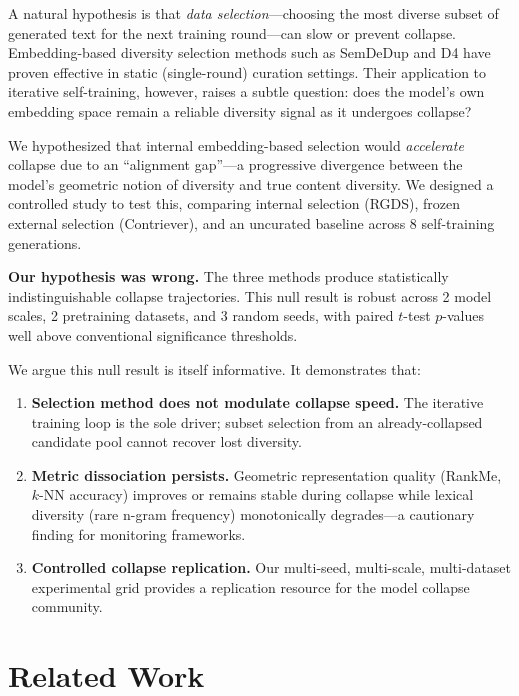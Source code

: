 \documentclass[11pt]{article}
\begin{document}
A natural hypothesis is that \emph{data selection}---choosing the most diverse subset of generated text for the next training round---can slow or prevent collapse. Embedding-based diversity selection methods such as SemDeDup \citep{abbas2023semdedup} and D4 \citep{tirumala2023d4} have proven effective in static (single-round) curation settings. Their application to iterative self-training, however, raises a subtle question: does the model's own embedding space remain a reliable diversity signal as it undergoes collapse?

We hypothesized that internal embedding-based selection would \emph{accelerate} collapse due to an ``alignment gap''---a progressive divergence between the model's geometric notion of diversity and true content diversity. We designed a controlled study to test this, comparing internal selection (RGDS), frozen external selection (Contriever), and an uncurated baseline across 8 self-training generations.

\textbf{Our hypothesis was wrong.} The three methods produce statistically indistinguishable collapse trajectories. This null result is robust across 2 model scales, 2 pretraining datasets, and 3 random seeds, with paired $t$-test $p$-values well above conventional significance thresholds.

We argue this null result is itself informative. It demonstrates that:
\begin{enumerate}
    \item \textbf{Selection method does not modulate collapse speed.} The iterative training loop is the sole driver; subset selection from an already-collapsed candidate pool cannot recover lost diversity.
    \item \textbf{Metric dissociation persists.} Geometric representation quality (RankMe, $k$-NN accuracy) improves or remains stable during collapse while lexical diversity (rare n-gram frequency) monotonically degrades---a cautionary finding for monitoring frameworks.
    \item \textbf{Controlled collapse replication.} Our multi-seed, multi-scale, multi-dataset experimental grid provides a replication resource for the model collapse community.
\end{enumerate}

\section{Related Work}
\end{document}
